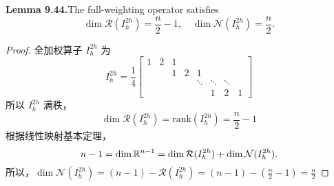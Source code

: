 \documentclass[lang=cn,a4paper,newtx,bibend=bibtex]{elegantpaper}
\begin{document}
\begin{prob}[Exercise 9.45]
\textbf{Lemma 9.44.}\quad The full-weighting operator satisfies
\[
  \dim \mathcal{R}(I_h^{2h}) = \frac{n}2 - 1,\quad
  \dim \mathcal{N}(I_h^{2h}) = \frac{n}2.
\]
\end{prob}

\begin{proof}
  全加权算子 $I_h^{2h}$ 为
  \[
    I_h^{2h} = \frac14 \begin{bmatrix}
      1 & 2 & 1 & & & & & \\
      & & 1 & 2 & 1 & & & \\
      & & & & \ddots & \ddots & \ddots & \\
      & & & & & 1 & 2 & 1
    \end{bmatrix}
  \]
  所以 $I_h^{2h}$ 满秩，
  \[
    \dim \mathcal{R}(I_h^{2h}) = \text{rank} (I_h^{2h}) = \frac{n}2 - 1
  \]
  根据线性映射基本定理，
  \[
    n - 1 = \dim \mathbb{R}^{n-1} = \dim \mathcal{R}(I_h^{2h}) + \dim \mathcal{N}(I_h^{2h}).
  \]
  所以，$\dim \mathcal{N}(I_h^{2h}) = 
  (n - 1) - \mathcal{R}(I_h^{2h}) 
  = (n - 1) - \left(\frac{n}2 - 1\right) 
  = \frac{n}2$
\end{proof}

\nocite{*}
\printbibliography[heading=bibintoc, title=\ebibname]
\end{document}

